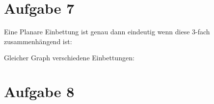 \documentclass[10pt,a4paper]{article}
\begin{document}
\section*{Aufgabe 7}

Eine Planare Einbettung ist genau dann eindeutig wenn diese 3-fach zusammenhängend ist:

\begin{center}
	\resizebox{.2\columnwidth}{!}{
		
	}
\end{center}

Gleicher Graph verschiedene Einbettungen:

\begin{center}
	\resizebox{.5\columnwidth}{!}{
		
	}
\end{center}


\section*{Aufgabe 8}
\end{document}
